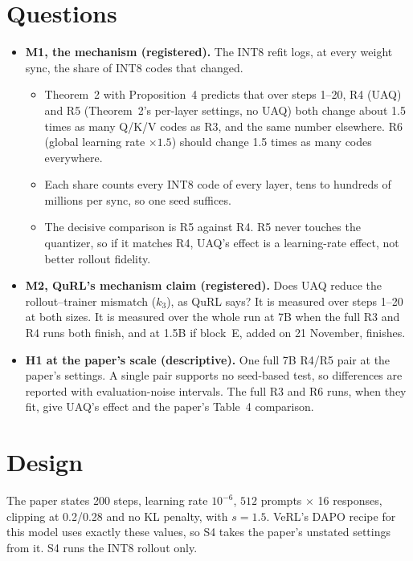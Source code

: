 \documentclass[11pt]{article}
\begin{document}
\tableofcontents

\section{Questions}\label{sec:questions}
\begin{itemize}
\item \textbf{M1, the mechanism (registered).} The INT8 refit logs, at every weight sync, the share of INT8 codes that changed.
  \begin{itemize}
  \item Theorem~2 with Proposition~4 predicts that over steps 1--20, R4 (UAQ) and R5 (Theorem~2's per-layer settings, no UAQ) both change about 1.5 times as many Q/K/V codes as R3, and the same number elsewhere. R6 (global learning rate $\times1.5$) should change 1.5 times as many codes everywhere.
  \item Each share counts every INT8 code of every layer, tens to hundreds of millions per sync, so one seed suffices.
  \item The decisive comparison is R5 against R4. R5 never touches the quantizer, so if it matches R4, UAQ's effect is a learning-rate effect, not better rollout fidelity.
  \end{itemize}
\item \textbf{M2, QuRL's mechanism claim (registered).} Does UAQ reduce the rollout--trainer mismatch ($k_3$), as QuRL says? It is measured over steps 1--20 at both sizes. It is measured over the whole run at 7B when the full R3 and R4 runs both finish, and at 1.5B if block~E, added on 21 November, finishes.
\item \textbf{H1 at the paper's scale (descriptive).} One full 7B R4/R5 pair at the paper's settings. A single pair supports no seed-based test, so differences are reported with evaluation-noise intervals. The full R3 and R6 runs, when they fit, give UAQ's effect and the paper's Table~4 comparison.
\end{itemize}

\section{Design}\label{sec:design}
The paper states 200 steps, learning rate $10^{-6}$, $512$ prompts $\times$ 16 responses, clipping at 0.2/0.28 and no KL penalty, with $s=1.5$. VeRL's DAPO recipe for this model uses exactly these values, so S4 takes the paper's unstated settings from it. S4 runs the INT8 rollout only.
\end{document}
